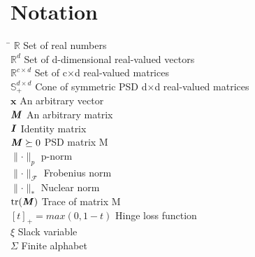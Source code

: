 \documentclass[12pt,a4paper]{report}
\DeclareMathOperator{\tr}{tr}
\begin{document}

\chapter{Notation}

\begin{tabbing}
\hspace{200pt}\=\kill
$\mathbb{R}$ \> Set of real numbers \\
$\mathbb{R}^d$ \> Set of d-dimensional real-valued vectors \\
$\mathbb{R}^{c \times d}$ \> Set of c$\times$d real-valued matrices \\
$\mathbb{S}^{d \times d}_+$ \> Cone of symmetric PSD d$\times$d real-valued matrices \\
$\textbf{x}$ \> An arbitrary vector \\
$\textbf{\textit{M}}$ \> An arbitrary matrix \\
$\textbf{\textit{I}}$ \> Identity matrix \\
$\textbf{\textit{M}} \succeq 0$ \> PSD matrix M \\
$\parallel \cdot \parallel_p$ \> p-norm \\
$\parallel \cdot \parallel_\mathcal{F}$ \> Frobenius norm \\
$\parallel \cdot \parallel_*$ \> Nuclear norm \\
$\tr(\textbf{\textit{M}})$ \> Trace of matrix M \\
$[t]_+ = max(0, 1-t)$ \> Hinge loss function \\
$\xi$ \> Slack variable \\
$\Sigma$ \> Finite alphabet \\


\end{tabbing}
\end{document}
